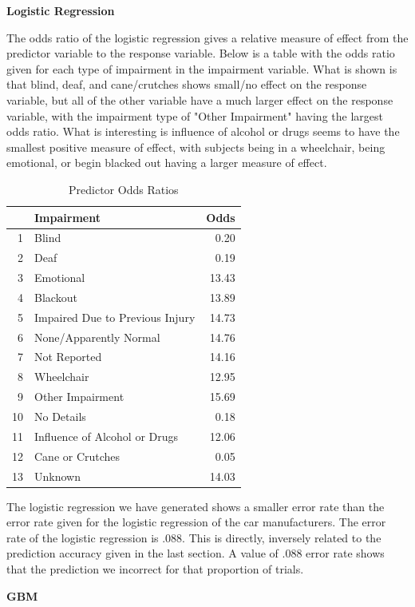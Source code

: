 \documentclass[11pt, oneside,titlepage]{article}   	%
\begin{document}
\textbf{Logistic Regression}

The odds ratio of the logistic regression gives a relative measure of effect from the predictor variable to the response variable. Below is a table with the odds ratio given for each type of impairment in the impairment variable.  What is shown is that blind, deaf, and cane/crutches shows small/no effect on the response variable, but all of the other variable have a much larger effect on the response variable, with the impairment type of "Other Impairment" having the largest odds ratio. What is interesting is influence of alcohol or drugs seems to have the smallest positive measure of effect, with subjects being in a wheelchair, being emotional, or begin blacked out having a larger measure of effect.

\begin{table}[ht]
\centering
\begin{tabular}{rlr}
  \hline
 & Impairment & Odds \\ 
  \hline
1 & Blind & 0.20 \\ 
  2 & Deaf & 0.19 \\ 
  3 & Emotional & 13.43 \\ 
  4 & Blackout & 13.89 \\ 
  5 & Impaired Due to Previous Injury & 14.73 \\ 
  6 & None/Apparently Normal & 14.76 \\ 
  7 & Not Reported & 14.16 \\ 
  8 & Wheelchair & 12.95 \\ 
  9 & Other Impairment & 15.69 \\ 
  10 & No Details & 0.18 \\ 
  11 & Influence of Alcohol or Drugs & 12.06 \\ 
  12 & Cane or Crutches & 0.05 \\ 
  13 & Unknown & 14.03 \\ 
   \hline
\end{tabular}
\caption{Predictor Odds Ratios}
\end{table}

The logistic regression we have generated shows a smaller error rate than the error rate given for the logistic regression of the car manufacturers. The error rate of the logistic regression is .088. This is directly, inversely related to the prediction accuracy given in the last section. A value of .088 error rate shows that the prediction we incorrect for that proportion of trials.

\textbf{GBM}
\end{document}
